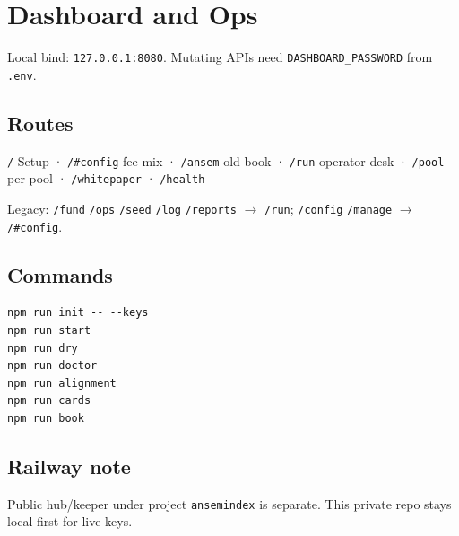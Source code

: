 \chapter{Dashboard and Ops}

Local bind: \texttt{127.0.0.1:8080}. Mutating APIs need \texttt{DASHBOARD\_PASSWORD} from \texttt{.env}.

\section{Routes}

\texttt{/} Setup · \texttt{/#config} fee mix · \texttt{/ansem} old-book · \texttt{/run} operator desk · \texttt{/pool} per-pool · \texttt{/whitepaper} · \texttt{/health}

Legacy: \texttt{/fund} \texttt{/ops} \texttt{/seed} \texttt{/log} \texttt{/reports} $\to$ \texttt{/run}; \texttt{/config} \texttt{/manage} $\to$ \texttt{/#config}.

\section{Commands}

\begin{lstlisting}
npm run init -- --keys
npm run start
npm run dry
npm run doctor
npm run alignment
npm run cards
npm run book
\end{lstlisting}

\section{Railway note}

Public hub/keeper under project \texttt{ansemindex} is separate. This private repo stays local-first for live keys.

